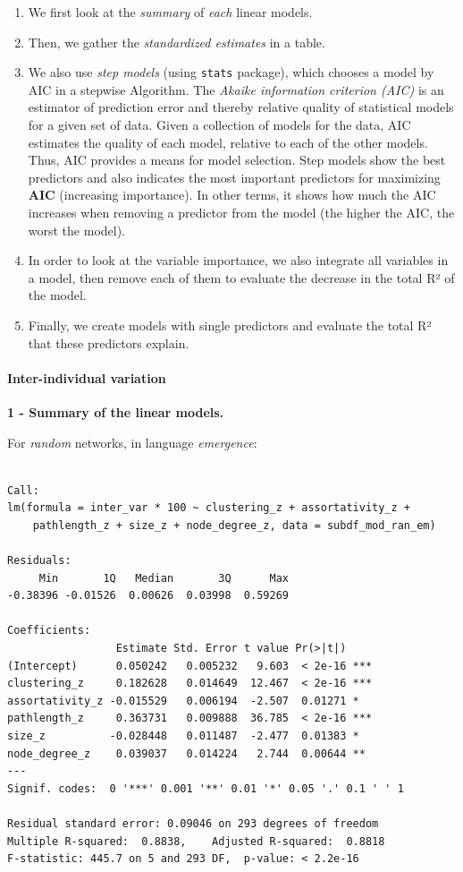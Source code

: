 \documentclass[
]{article}
\begin{document}
\begin{enumerate}
\def\labelenumi{\arabic{enumi}.}
\item
  We first look at the \emph{summary} of \emph{each} linear models.
\item
  Then, we gather the \emph{standardized estimates} in a table.
\item
  We also use \emph{step models} (using \texttt{stats} package), which
  chooses a model by AIC in a stepwise Algorithm. The \emph{Akaike
  information criterion (AIC)} is an estimator of prediction error and
  thereby relative quality of statistical models for a given set of
  data. Given a collection of models for the data, AIC estimates the
  quality of each model, relative to each of the other models. Thus, AIC
  provides a means for model selection. Step models show the best
  predictors and also indicates the most important predictors for
  maximizing \textbf{AIC} (increasing importance). In other terms, it
  shows how much the AIC increases when removing a predictor from the
  model (the higher the AIC, the worst the model).
\item
  In order to look at the variable importance, we also integrate all
  variables in a model, then remove each of them to evaluate the
  decrease in the total R² of the model.
\item
  Finally, we create models with single predictors and evaluate the
  total R² that these predictors explain.
\end{enumerate}

\hypertarget{inter-individual-variation}{%
\paragraph{Inter-individual
variation}\label{inter-individual-variation}}

\textbf{1 - Summary of the linear models.}

For \emph{random} networks, in language \emph{emergence}:

\begin{verbatim}

Call:
lm(formula = inter_var * 100 ~ clustering_z + assortativity_z + 
    pathlength_z + size_z + node_degree_z, data = subdf_mod_ran_em)

Residuals:
     Min       1Q   Median       3Q      Max 
-0.38396 -0.01526  0.00626  0.03998  0.59269 

Coefficients:
                 Estimate Std. Error t value Pr(>|t|)    
(Intercept)      0.050242   0.005232   9.603  < 2e-16 ***
clustering_z     0.182628   0.014649  12.467  < 2e-16 ***
assortativity_z -0.015529   0.006194  -2.507  0.01271 *  
pathlength_z     0.363731   0.009888  36.785  < 2e-16 ***
size_z          -0.028448   0.011487  -2.477  0.01383 *  
node_degree_z    0.039037   0.014224   2.744  0.00644 ** 
---
Signif. codes:  0 '***' 0.001 '**' 0.01 '*' 0.05 '.' 0.1 ' ' 1

Residual standard error: 0.09046 on 293 degrees of freedom
Multiple R-squared:  0.8838,    Adjusted R-squared:  0.8818 
F-statistic: 445.7 on 5 and 293 DF,  p-value: < 2.2e-16
\end{verbatim}
\end{document}
